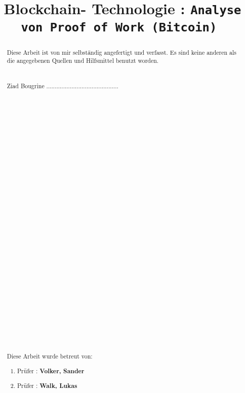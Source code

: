 \documentclass[ngerman]{scrreprt}
\title{Blockchain- Technologie : \texttt{Analyse von Proof of Work (Bitcoin) }}
\begin{document}


	
  \maketitle  
  
  \begin{abstract}
  	Diese Arbeit ist von mir selbständig angefertigt und verfasst. Es sind keine anderen
  	als die angegebenen Quellen und Hilfsmittel benutzt worden. \\ \\ \\
  	Ziad Bougrine ...........................................
  	\\ \\ \\ \\ \\ \\ \\ \\ \\ \\ \\ \\ \\ \\ \\ \\ \\ \\ \\ \\  \\ \\ \\ \\ \\ \\ \\ \\ \\ \\ \\ \\
  	Diese Arbeit wurde betreut von:\\
  	\begin{enumerate}
  		\item Prüfer : \textbf{Volker, Sander}
  		\item Prüfer : \textbf{Walk, Lukas}
  	\end{enumerate}
  	
  \end{abstract}
\end{document}
